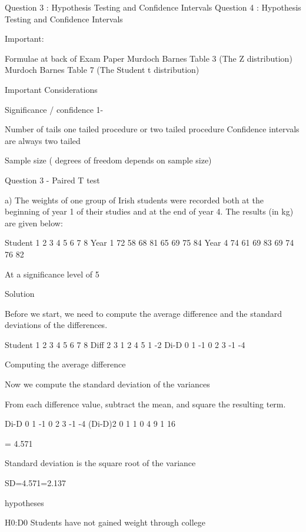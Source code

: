 \documentclass[12pt]{report}
\begin{document}
Question 3 : Hypothesis Testing and Confidence Intervals
Question 4 : Hypothesis Testing and Confidence Intervals

Important:

Formulae at back of Exam Paper
Murdoch Barnes Table 3 (The Z distribution)
Murdoch Barnes Table 7 (The Student t distribution)

Important Considerations

Significance     /    confidence 1-

Number of tails   
one tailed procedure or two tailed procedure
Confidence intervals are always two tailed

Sample size   ( degrees of freedom depends on sample size)




Question 3 - Paired T test

a) The weights of one group of Irish students were recorded both at the beginning of year 1 of their studies and at the end of year 4.
The results (in kg) are given below:

Student
1
2
3
4
5
6
7
8
Year 1
72
58
68
81
65
69
75
84
Year 4
74
61
69
83
69
74
76
82

At a significance level of 5%


Solution

Before we start, we need to compute the average difference and the standard deviations of the differences. 

Student
1
2
3
4
5
6
7
8
Diff
2
3
1
2
4
5
1
-2
Di-D
0
1
-1
0
2
3
-1
-4


Computing the average difference




Now we compute the standard deviation of the variances

From each difference value, subtract the mean, and square the resulting term.


Di-D
0
1
-1
0
2
3
-1
-4
(Di-D)2
0
1
1
0
4
9
1
16





= 4.571

Standard deviation is the square root of the variance

SD=4.571=2.137



hypotheses

H0:D0    Students have not gained weight through college
\end{document}
